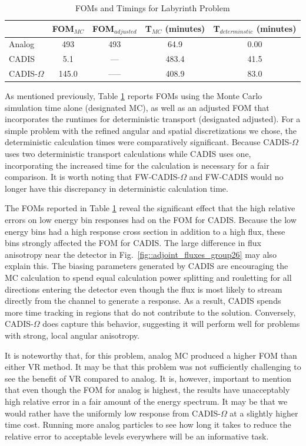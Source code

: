 \documentclass[12pt]{article}
\begin{document}
 \begin{table}
  \centering
  \caption{\label{tab:FOMLabI}FOMs and Timings for Labyrinth Problem}
  \begin{tabular}{l|cc|cc}
    \toprule
        & FOM$_{MC}$ & FOM$_{adjusted}$ & T$_{MC}$ (minutes) & T$_{determinstic}$ (minutes) \\
    \hline
    Analog           & 493   &  493     & 64.9      & 0.00 \\ 
    CADIS            & 5.1   &  ---     & 483.4     & 41.5  \\
    CADIS-$\Omega$   & 145.0 &  -----   & 408.9     & 83.0  \\  
	\bottomrule
  \end{tabular}
\end{table}

As mentioned previously, Table \ref{tab:FOMLabI} reports FOMs using the Monte Carlo simulation time alone (designated MC), as well as an adjusted FOM that incorporates the runtimes for deterministic transport (designated adjusted). For a simple problem with the refined angular and spatial discretizations we chose, the deterministic calculation times were comparatively significant.
Because CADIS-$\Omega$ uses two deterministic transport calculations while CADIS uses one, incorporating the increased time for the calculation is necessary for a fair comparison.
It is worth noting that FW-CADIS-$\Omega$ and FW-CADIS would no longer have this discrepancy in deterministic calculation time.

The FOMs reported in Table \ref{tab:FOMLabI} reveal the significant effect that the high relative errors on low energy bin responses had on the FOM for CADIS. Because the low energy bins had a high response cross section in addition to a high flux, these bins strongly affected the FOM for CADIS. The large difference in flux anisotropy near the detector in Fig.~\ref{fig::adjoint_fluxes_group26} may also explain this. The biasing parameters generated by CADIS are encouraging the MC calculation to spend equal calculation power splitting and rouletting for all directions entering the detector even though the flux is most likely to stream directly from the channel to generate a response. As a result, CADIS spends more time tracking in regions that do not contribute to the solution. Conversely, CADIS-$\Omega$ does capture this behavior, suggesting it will perform well for problems with strong, local angular anisotropy.  

It is noteworthy that, for this problem, analog MC produced a higher FOM than either VR method. 
It may be that this problem was not sufficiently challenging to see the benefit of VR compared to analog. 
It is, however, important to mention that even though the FOM for analog is highest, the results have unacceptably high relative error in a fair amount of the energy spectrum. 
It may be that we would rather have the uniformly low response from CADIS-$\Omega$ at a slightly higher time cost.
Running more analog particles to see how long it takes to reduce the relative error to acceptable levels everywhere will be an informative task. 
\end{document}

